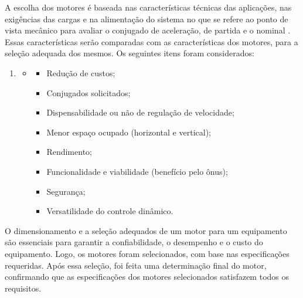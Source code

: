A escolha dos motores é baseada nas características técnicas das aplicações, nas exigências das cargas e na alimentação do sistema no que se refere ao ponto de vista mecânico para avaliar o conjugado de aceleração, de partida e o nominal \cite{santos_2016}. Essas características serão comparadas com as características dos motores, para a seleção adequada dos mesmos. Os seguintes itens foram considerados:

\begin{enumerate}
    \item[ ]
    \begin{itemize}
        \item[ ]
        \begin{itemize}
            \item Redução de custos;
            \item Conjugados solicitados;
            \item Dispensabilidade ou não de regulação de velocidade;
            \item Menor espaço ocupado (horizontal e vertical);
            \item Rendimento;
            \item Funcionalidade e viabilidade (benefício pelo ônus);
            \item Segurança;
            \item Versatilidade do controle dinâmico.
        \end{itemize}
    \end{itemize}
\end{enumerate}

O dimensionamento e a seleção adequados de um motor para um equipamento são essenciais para garantir a confiabilidade, o desempenho e o custo do equipamento. Logo, os motores foram selecionados, com base nas especificações requeridas. Após essa seleção, foi feita uma determinação final do motor, confirmando que as especificações dos motores selecionados satisfazem todos os requisitos.


